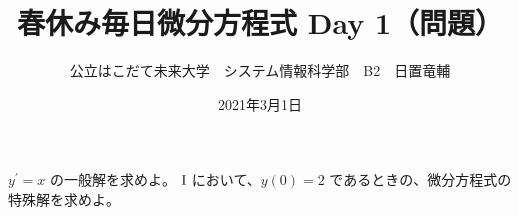 \documentclass[dvipdfmx,uplatex]{jsarticle}
\title{春休み毎日微分方程式 Day 1（問題）}
\author{公立はこだて未来大学　システム情報科学部　B2　日置竜輔}
\date{2021年3月1日}
\begin{document}
\maketitle

\begin{qparts}
    \qpart $ y ^ {\prime} = x $ の一般解を求めよ。
    \qpart $\rm I $ において、$ y(0) = 2 $ であるときの、微分方程式の特殊解を求めよ。
\end{qparts}
\end{document}
